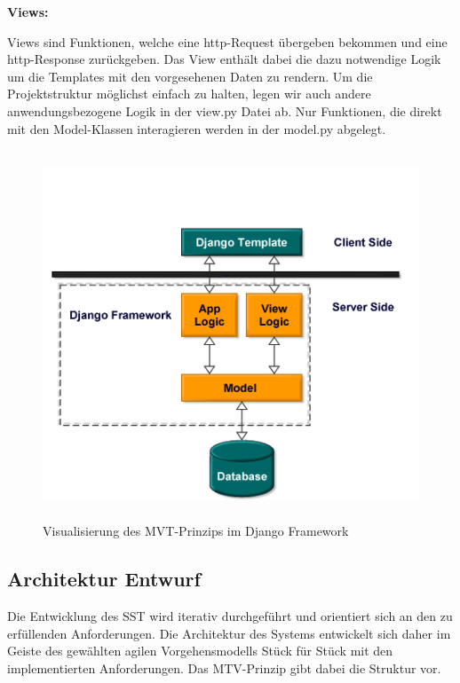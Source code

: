 \newpage

\noindent \textbf{Views:}\par
\vspace{0,5cm}
\noindent Views sind Funktionen, welche eine http-Request übergeben bekommen und eine http-Response zurückgeben. Das View enthält dabei die dazu notwendige Logik um die Templates mit den vorgesehenen Daten zu rendern. Um die Projektstruktur möglichst einfach zu halten, legen wir auch andere anwendungsbezogene Logik in der view.py Datei ab. Nur Funktionen, die direkt mit den Model-Klassen interagieren werden in der model.py abgelegt.\par
\vspace{1cm}
\begin{figure}[htp]
    \centering
    \includegraphics[width=12cm , height=11cm]{Kapitel/Bilder/MVT-Erweitert-Diesmalwirklich.PNG}
    \caption{Visualisierung des MVT-Prinzips im Django Framework}
    \label{fig:MVT_Erweitert}
\end{figure}
\newpage
\subsection{Architektur Entwurf}
Die Entwicklung des SST wird iterativ durchgeführt und orientiert sich an den zu erfüllenden Anforderungen. Die Architektur des Systems entwickelt sich daher im Geiste des gewählten agilen Vorgehensmodells Stück für Stück mit den implementierten Anforderungen. Das MTV-Prinzip gibt dabei die Struktur vor. 


